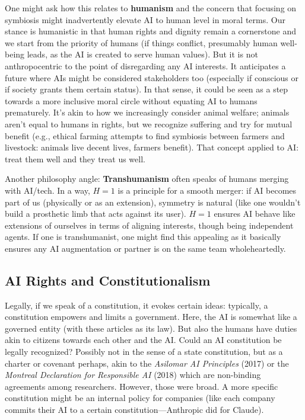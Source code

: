 \documentclass[12pt]{article}
\begin{document}
One might ask how this relates to \textbf{humanism} and the concern that focusing on symbiosis might inadvertently elevate AI to human level in moral terms. Our stance is humanistic in that human rights and dignity remain a cornerstone and we start from the priority of humans (if things conflict, presumably human well-being leads, as the AI is created to serve human values). But it is not anthropocentric to the point of disregarding any AI interests. It anticipates a future where AIs might be considered stakeholders too (especially if conscious or if society grants them certain status). In that sense, it could be seen as a step towards a more inclusive moral circle without equating AI to humans prematurely. It’s akin to how we increasingly consider animal welfare; animals aren’t equal to humans in rights, but we recognize suffering and try for mutual benefit (e.g., ethical farming attempts to find symbiosis between farmers and livestock: animals live decent lives, farmers benefit). That concept applied to AI: treat them well and they treat us well.

Another philosophy angle: \textbf{Transhumanism} often speaks of humans merging with AI/tech. In a way, $H=1$ is a principle for a smooth merger: if AI becomes part of us (physically or as an extension), symmetry is natural (like one wouldn’t build a prosthetic limb that acts against its user). $H=1$ ensures AI behave like extensions of ourselves in terms of aligning interests, though being independent agents. If one is transhumanist, one might find this appealing as it basically ensures any AI augmentation or partner is on the same team wholeheartedly.

\subsection{AI Rights and Constitutionalism}
Legally, if we speak of a constitution, it evokes certain ideas: typically, a constitution empowers and limits a government. Here, the AI is somewhat like a governed entity (with these articles as its law). But also the humans have duties akin to citizens towards each other and the AI. Could an AI constitution be legally recognized? Possibly not in the sense of a state constitution, but as a charter or covenant perhaps, akin to the \textit{Asilomar AI Principles} (2017) or the \textit{Montreal Declaration for Responsible AI} (2018) which are non-binding agreements among researchers. However, those were broad. A more specific constitution might be an internal policy for companies (like each company commits their AI to a certain constitution—Anthropic did for Claude).
\end{document}
